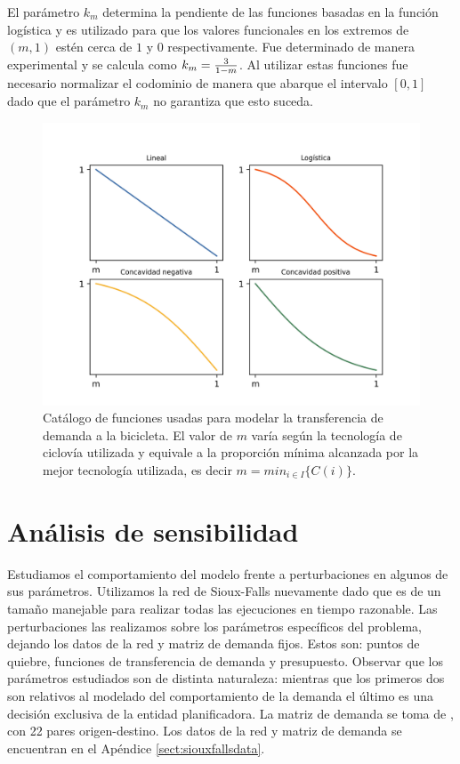 El parámetro $k_m$ determina la pendiente de las funciones basadas en la función logística y es utilizado para que los valores funcionales en los extremos de $(m, 1)$ estén cerca de $1$ y $0$ respectivamente. Fue determinado de manera experimental y se calcula como $k_m = {3 \over 1 - m}$. Al utilizar estas funciones fue necesario normalizar el codominio de manera que abarque el intervalo $[0, 1]$ dado que el parámetro $k_m$ no garantiza que esto suceda.

\begin{figure}[h!]
  \centering
  \includegraphics[width=14cm]{../resources/f_catalog.png}
    \caption{Catálogo de funciones usadas para modelar la transferencia de demanda a la bicicleta. El valor de $m$ varía según la tecnología de ciclovía utilizada y equivale a la proporción mínima alcanzada por la mejor tecnología utilizada, es decir $m = min_{i \in I} \{ C(i) \}$.}
  \label{fig:fcatalog}
\end{figure}

\section{Análisis de sensibilidad}
\label{sect:sensibilityanalysis}

Estudiamos el comportamiento del modelo frente a perturbaciones en algunos de sus parámetros. Utilizamos la red de Sioux-Falls nuevamente dado que es de un tamaño manejable para realizar todas las ejecuciones en tiempo razonable. Las perturbaciones las realizamos sobre los parámetros específicos del problema, dejando los datos de la red y matriz de demanda fijos. Estos son: puntos de quiebre, funciones de transferencia de demanda y presupuesto. Observar que los parámetros estudiados son de distinta naturaleza: mientras que los primeros dos son relativos al modelado del comportamiento de la demanda el último es una decisión exclusiva de la entidad planificadora. La matriz de demanda se toma de \textcite{Liu2019}, con 22 pares origen-destino. Los datos de la red y matriz de demanda se encuentran en el Apéndice \ref{sect:siouxfallsdata}.

